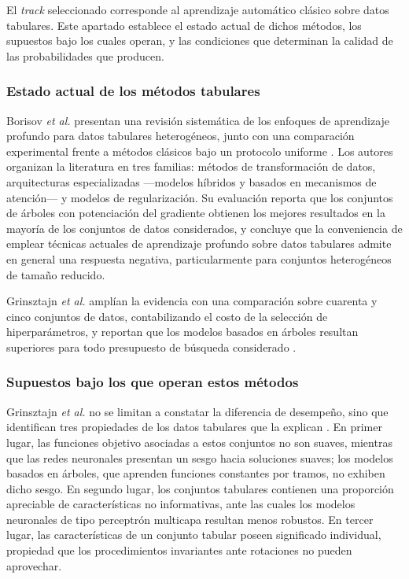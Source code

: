 El \textit{track} seleccionado corresponde al aprendizaje automático
clásico sobre datos tabulares. Este apartado establece el estado actual de
dichos métodos, los supuestos bajo los cuales operan, y las condiciones que
determinan la calidad de las probabilidades que producen.

\subsubsection{Estado actual de los métodos tabulares}

Borisov \textit{et al.} presentan una revisión sistemática de los enfoques
de aprendizaje profundo para datos tabulares heterogéneos, junto con una
comparación experimental frente a métodos clásicos bajo un protocolo
uniforme \cite{borisov_tabular_2024}. Los autores organizan la literatura
en tres familias: métodos de transformación de datos, arquitecturas
especializadas ---modelos híbridos y basados en mecanismos de atención--- y
modelos de regularización. Su evaluación reporta que los conjuntos de
árboles con potenciación del gradiente obtienen los mejores resultados en
la mayoría de los conjuntos de datos considerados, y concluye que la
conveniencia de emplear técnicas actuales de aprendizaje profundo sobre
datos tabulares admite en general una respuesta negativa, particularmente
para conjuntos heterogéneos de tamaño reducido.

Grinsztajn \textit{et al.} amplían la evidencia con una comparación sobre
cuarenta y cinco conjuntos de datos, contabilizando el costo de la
selección de hiperparámetros, y reportan que los modelos basados en árboles
resultan superiores para todo presupuesto de búsqueda considerado
\cite{grinsztajn_trees_2022}.

\subsubsection{Supuestos bajo los que operan estos métodos}

Grinsztajn \textit{et al.} no se limitan a constatar la diferencia de
desempeño, sino que identifican tres propiedades de los datos tabulares que
la explican \cite{grinsztajn_trees_2022}. En primer lugar, las funciones
objetivo asociadas a estos conjuntos no son suaves, mientras que las redes
neuronales presentan un sesgo hacia soluciones suaves; los modelos basados
en árboles, que aprenden funciones constantes por tramos, no exhiben dicho
sesgo. En segundo lugar, los conjuntos tabulares contienen una proporción
apreciable de características no informativas, ante las cuales los modelos
neuronales de tipo perceptrón multicapa resultan menos robustos. En tercer
lugar, las características de un conjunto tabular poseen significado
individual, propiedad que los procedimientos invariantes ante rotaciones no
pueden aprovechar.

